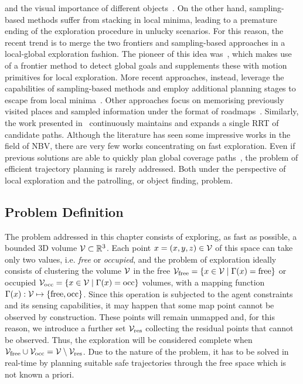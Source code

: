 and the visual importance of different objects~\cite{dang2018visual}. On the other hand, sampling-based methods suffer from stacking
in local minima, leading to a premature ending of the exploration procedure in unlucky scenarios. For this reason, the recent trend is
to merge the two frontiers and sampling-based approaches in a local-global exploration fashion. The pioneer of this idea
was~\cite{charrow2015information}, which makes use of a frontier method to detect global goals and supplements these with motion primitives
for local exploration. More recent approaches, instead, leverage the capabilities of sampling-based methods and employ additional planning
stages to escape from local minima~\cite{selin2019efficient,dang2019graph}. Other approaches focus on memorising previously visited places
and sampled information under the format of roadmaps~\cite{witting2018history, xu2021autonomous}. Similarly, the work presented
in~\cite{schmid2020efficient} continuously maintains and expands a single RRT of candidate paths. Although the literature has seen some
impressive works in the field of NBV, there are very few works concentrating on fast exploration. Even if previous solutions are able to
quickly plan global coverage paths~\cite{schmid2020efficient, xu2021autonomous, kompis2021informed}, the problem of efficient trajectory
planning is rarely addressed. Both under the perspective of local exploration and the patrolling, or object finding, problem.

\subsection{Problem Definition}%
\label{SEC:EXPLORATION-PROBLEM-DEFINITION}
The problem addressed in this chapter consists of exploring, as fast as possible, a bounded 3D volume $\mathcal{V} \subset \mathbb{R}^3$.
Each point $ x = \left( x, y, z \right) \in \mathcal{V}$ of this space can take only two values, i.e. \emph{free} or \emph{occupied},
and  the problem of exploration ideally consists of clustering the volume $\mathcal{V}$ in the free
$\mathcal{V}_{\text{free}} = \{ x \in \mathcal{V} \mid \Gamma(x) = \text{free} \}$ or occupied
$\mathcal{V}_{\text{occ}} = \{ x \in \mathcal{V} \mid \Gamma(x) = \text{occ} \}$ volumes, with a mapping function
$\Gamma(x): \mathcal{V} \mapsto \left\{ \text{free}, \text{occ} \right\}$.
Since this operation is subjected to the agent constraints and its sensing capabilities, it may happen that some map point
cannot be observed by construction. These points will remain unmapped and, for this reason, we introduce a further set
$\mathcal{V}_{\text{res}}$ collecting the residual points that cannot be observed. Thus, the exploration will be considered complete
when $\mathcal{V}_{\text{free}} \cup \mathcal{V}_{\text{occ}} = \mathcal{V} \setminus \mathcal{V}_{\text{res}}$. Due to the nature of the problem, it has to be
solved in real-time by planning suitable safe trajectories through the free space which is not known a priori.


